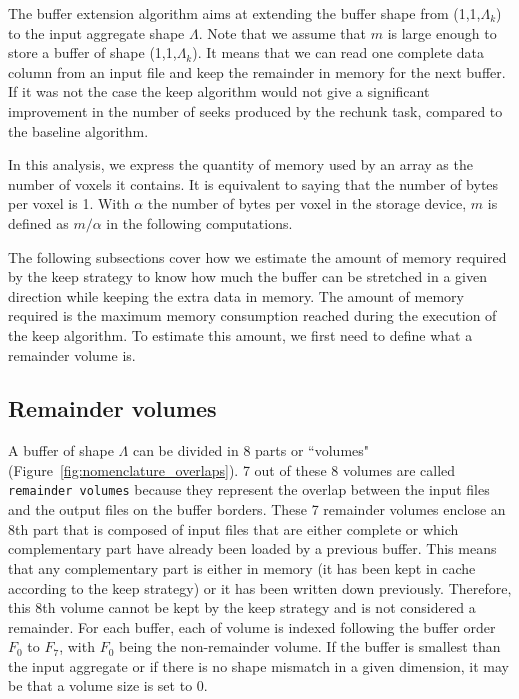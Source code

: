 \documentclass[conference]{IEEEtran}
\begin{document}
The buffer extension algorithm aims at extending the buffer shape from
(1,1,$\Lambda_k$) to the input aggregate shape $\Lambda$. Note that we assume
that $m$ is large enough to store a buffer of shape (1,1,$\Lambda_k$). It means
that we can read one complete data column from an input file and keep the
remainder in memory for the next buffer. If it was not the case the keep
algorithm would not give a significant improvement in the number of seeks
produced by the rechunk task, compared to the baseline algorithm.

In this analysis, we express the quantity of memory used by an array as the
number of voxels it contains. It is equivalent to saying that the number of
bytes per voxel is 1. With $\alpha$ the number of bytes per voxel in the storage
device, $m$ is defined as $m/\alpha$ in the following computations.

The following subsections cover how we estimate the amount of memory required
by the keep strategy to know how much the buffer can be stretched in a given
direction while keeping the extra data in memory. The amount of memory required
is the maximum memory consumption reached during the execution of the keep algorithm.
To estimate this amount, we first need to define what a remainder volume is.

\subsection{Remainder volumes}

A buffer of shape $\Lambda$ can be divided in
8 parts or ``volumes" (Figure~\ref{fig:nomenclature_overlaps}).
7 out of these 8 volumes are called \texttt{remainder volumes} because
they represent the overlap between the input files and the output files on
the buffer borders. These 7 remainder volumes enclose an 8th part that is composed of
input files that are either complete or which complementary part have already
been loaded by a previous buffer. This means that any complementary part is either
in memory (it has been kept in cache according to the keep strategy) or it has
been written down previously. Therefore, this 8th volume cannot be kept by the
keep strategy and is not considered a remainder. For each buffer, each of volume
is indexed following the buffer order $F_0$ to $F_7$, with $F_0$ being the
non-remainder volume. If the buffer is smallest than the input aggregate or if
there is no shape mismatch in a given dimension, it may be that a volume size
is set to 0.
\end{document}
